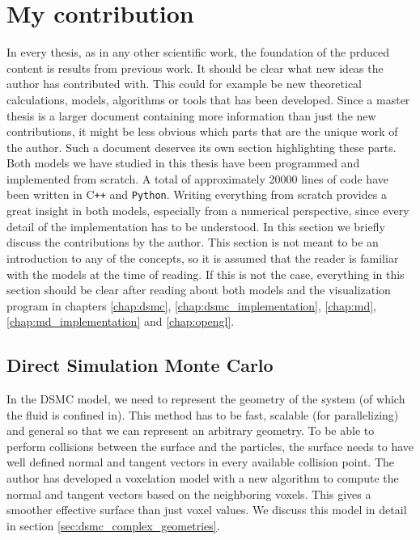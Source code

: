 \section{My contribution}
In every thesis, as in any other scientific work, the foundation of the prduced content is results from previous work. It should be clear what new ideas the author has contributed with. This could for example be new theoretical calculations, models, algorithms or tools that has been developed. Since a master thesis is a larger document containing more information than just the new contributions, it might be less obvious which parts that are the unique work of the author. Such a document deserves its own section highlighting these parts.\\
Both models we have studied in this thesis have been programmed and implemented from scratch. A total of approximately 20000 lines of code have been written in C{}\verb!++! and \verb!Python!. Writing everything from scratch provides a great insight in both models, especially from a numerical perspective, since every detail of the implementation has to be understood. In this section we briefly discuss the contributions by the author. This section is not meant to be an introduction to any of the concepts, so it is assumed that the reader is familiar with the models at the time of reading. If this is not the case, everything in this section should be clear after reading about both models and the visualization program in chapters \ref{chap:dsmc}, \ref{chap:dsmc_implementation}, \ref{chap:md}, \ref{chap:md_implementation} and \ref{chap:opengl}.
\subsection{Direct Simulation Monte Carlo}
In the DSMC model, we need to represent the geometry of the system (of which the fluid is confined in). This method has to be fast, scalable (for parallelizing) and general so that we can represent an arbitrary geometry. To be able to perform collisions between the surface and the particles, the surface needs to have well defined normal and tangent vectors in every available collision point. The author has developed a voxelation model with a new algorithm to compute the normal and tangent vectors based on the neighboring voxels. This gives a smoother effective surface than just voxel values. We discuss this model in detail in section \ref{sec:dsmc_complex_geometries}.
